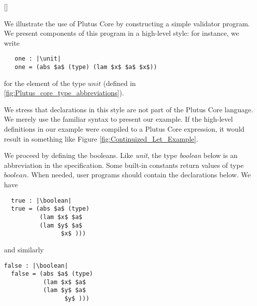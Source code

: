 \documentclass[../plutus-core-specification.tex]{subfiles}
\begin{document}
\newcommand\unit{$\mathit{unit}$}
\newcommand\boolean{$\mathit{boolean}$}
\newcommand\signed{$\mathit{signed}$}
\newcommand\txhash{$\mathit{txhash}$}
\newcommand\pubkey{$\mathit{pubkey}$}
\newcommand\blocknum{$\mathit{blocknum}$}

[]

We illustrate the use of Plutus Core by constructing a simple
validator program. We present components of this program in a
high-level style: for instance, we write
\begin{lstlisting}
   one : |\unit|
   one = (abs $a$ (type) (lam $x$ $a$ $x$))
\end{lstlisting}
for the element of the type $unit$ (defined in \ref{fig:Plutus_core_type_abbreviations}).

We stress that declarations in this style are not part of the Plutus
Core language. We merely use the familiar syntax to present our
example. If the high-level definitions in our example were compiled to
a Plutus Core expression, it would result in something like Figure
\ref{fig:Continuized_Let_Example}.

We proceed by defining the booleans. Like \textit{unit}, the type \textit{boolean}
below is an abbreviation in the specification. Some built-in constants
return values of type $boolean$. When needed, user programs should
contain the declarations below. We have


\begin{lstlisting}
  true : |\boolean|
  true = (abs $a$ (type)
          (lam $x$ $a$
          (lam $y$ $a$
                $x$ )))
\end{lstlisting}
and similarly
\begin{lstlisting}[basicstyle=\ttfamily,mathescape]
  false : |\boolean|
  false = (abs $a$ (type)
           (lam $x$ $a$
           (lam $y$ $a$
                 $y$ )))
\end{lstlisting}
\end{document}
